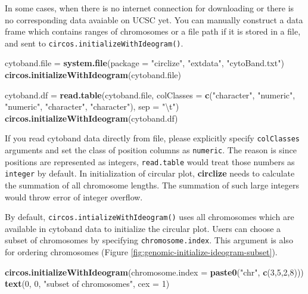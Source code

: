 \documentclass[]{book}
\newenvironment{Shaded}{\begin{snugshade}}{\end{snugshade}}
\newcommand{\KeywordTok}[1]{\textcolor[rgb]{0.13,0.29,0.53}{\textbf{#1}}}
\newcommand{\DataTypeTok}[1]{\textcolor[rgb]{0.13,0.29,0.53}{#1}}
\newcommand{\DecValTok}[1]{\textcolor[rgb]{0.00,0.00,0.81}{#1}}
\newcommand{\CharTok}[1]{\textcolor[rgb]{0.31,0.60,0.02}{#1}}
\newcommand{\StringTok}[1]{\textcolor[rgb]{0.31,0.60,0.02}{#1}}
\newcommand{\NormalTok}[1]{#1}
\theoremstyle{definition}
\theoremstyle{definition}
\theoremstyle{remark}
\begin{document}
In some cases, when there is no internet connection for downloading or
there is no corresponding data avaiable on UCSC yet. You can manually
construct a data frame which contains ranges of chromosomes or a file
path if it is stored in a file, and sent to
\texttt{circos.initializeWithIdeogram()}.

\begin{Shaded}
\begin{Highlighting}[]
\NormalTok{cytoband.file =}\StringTok{ }\KeywordTok{system.file}\NormalTok{(}\DataTypeTok{package =} \StringTok{"circlize"}\NormalTok{, }\StringTok{"extdata"}\NormalTok{, }\StringTok{"cytoBand.txt"}\NormalTok{)}
\KeywordTok{circos.initializeWithIdeogram}\NormalTok{(cytoband.file)}

\NormalTok{cytoband.df =}\StringTok{ }\KeywordTok{read.table}\NormalTok{(cytoband.file, }\DataTypeTok{colClasses =} \KeywordTok{c}\NormalTok{(}\StringTok{"character"}\NormalTok{, }\StringTok{"numeric"}\NormalTok{,}
    \StringTok{"numeric"}\NormalTok{, }\StringTok{"character"}\NormalTok{, }\StringTok{"character"}\NormalTok{), }\DataTypeTok{sep =} \StringTok{"}\CharTok{\textbackslash{}t}\StringTok{"}\NormalTok{)}
\KeywordTok{circos.initializeWithIdeogram}\NormalTok{(cytoband.df)}
\end{Highlighting}
\end{Shaded}

If you read cytoband data directly from file, please explicitly specify
\texttt{colClasses} arguments and set the class of position columns as
\texttt{numeric}. The reason is since positions are represented as
integers, \texttt{read.table} would treat those numbers as
\texttt{integer} by default. In initialization of circular plot,
\textbf{circlize} needs to calculate the summation of all chromosome
lengths. The summation of such large integers would throw error of
integer overflow.

By default, \texttt{circos.intializeWithIdeogram()} uses all chromosomes
which are available in cytoband data to initialize the circular plot.
Users can choose a subset of chromosomes by specifying
\texttt{chromosome.index}. This argument is also for ordering
chromosomes (Figure \ref{fig:genomic-initialize-ideogram-subset}).

\begin{Shaded}
\begin{Highlighting}[]
\KeywordTok{circos.initializeWithIdeogram}\NormalTok{(}\DataTypeTok{chromosome.index =} \KeywordTok{paste0}\NormalTok{(}\StringTok{"chr"}\NormalTok{, }\KeywordTok{c}\NormalTok{(}\DecValTok{3}\NormalTok{,}\DecValTok{5}\NormalTok{,}\DecValTok{2}\NormalTok{,}\DecValTok{8}\NormalTok{)))}
\KeywordTok{text}\NormalTok{(}\DecValTok{0}\NormalTok{, }\DecValTok{0}\NormalTok{, }\StringTok{"subset of chromosomes"}\NormalTok{, }\DataTypeTok{cex =} \DecValTok{1}\NormalTok{)}
\end{Highlighting}
\end{Shaded}
\end{document}
